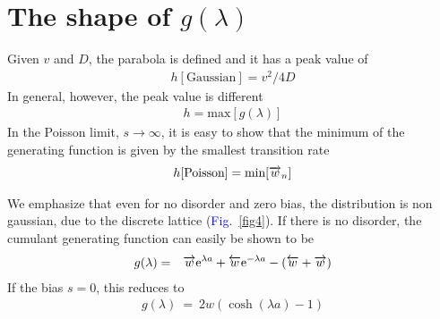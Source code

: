 \documentclass[aps,pre,floats,floatfix,fleqn]{revtex4}
\newcommand{\eexp}{\mbox{e}^}
\newcommand{\beq}{\begin{eqnarray}}
\newcommand{\eeq}{\end{eqnarray}}
\newcommand{\Fig}[1] {\textcolor{blue}{Fig.~\ref{#1}}} %
\newcommand{\ola}{\protect\overleftarrow}
\newcommand{\ora}{\protect\overrightarrow}
\begin{document}
\section{The shape of $g(\lambda)$}
Given $v$ and $D$, the parabola is defined and it has a peak value of 
%
\beq
h[\text{Gaussian}] = v^2/4D
\eeq
%
In general, however, the peak value is different 
%
\beq
h = \text{max} [g(\lambda)]
\eeq
%
In the Poisson limit, $s\to \infty$, it is easy to show that 
the minimum of the generating function is given by the smallest transition rate
%
\beq
h[\text{Poisson}] = \text{min}[\ora{w}_n]
\eeq
%


We emphasize that even for no disorder and zero bias, the distribution is non gaussian, due to the discrete lattice (\Fig{fig4}).
If there is no disorder, the cumulant generating function can easily be shown to be 
%
\beq
g(\lambda) &=& \ora{w} \eexp{\lambda a} + \ola{w} \eexp{-\lambda a} -(\ola{w}+\ora{w}) 
\eeq
%
If the bias $s=0$, this reduces to
%
\beq
g(\lambda) \ =  \ 2w(\cosh(\lambda a)-1)
\eeq
%
%

%
%
\end{document}

